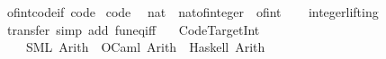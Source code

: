 \begin{isabellebody}
\isamarkupfalse%
%
\endisatagproof
{\isafoldproof}%
%
\isadelimproof
\isanewline
%
\endisadelimproof
\isanewline
{}\isamarkupfalse%
\ of{\isacharunderscore}int{\isacharunderscore}code{\isacharunderscore}if\ {\isacharbrackleft}code{\isacharbrackright}\isanewline
\isanewline
{}\isamarkupfalse%
\ {\isacharbrackleft}code{\isacharbrackright}{\isacharcolon}\isanewline
\ \ {\isachardoublequoteopen}nat\ {\isacharequal}\ nat{\isacharunderscore}of{\isacharunderscore}integer\ {\isasymcirc}\ of{\isacharunderscore}int{\isachardoublequoteclose}\isanewline
\ \ \isamarkupfalse%
\ integer{\isachardot}lifting%
\isadelimproof
\ %
\endisadelimproof
%
\isatagproof
{}\isamarkupfalse%
\ transfer\ {\isacharparenleft}simp\ add{\isacharcolon}\ fun{\isacharunderscore}eq{\isacharunderscore}iff{\isacharparenright}%
\endisatagproof
{\isafoldproof}%
%
\isadelimproof
%
\endisadelimproof
\isanewline
\isanewline
{}\isamarkupfalse%
\isanewline
\ \ \ Code{\isacharunderscore}Target{\isacharunderscore}Int\ {\isasymrightharpoonup}\isanewline
\ \ \ \ {\isacharparenleft}SML{\isacharparenright}\ Arith\ \ {\isacharparenleft}OCaml{\isacharparenright}\ Arith\ \ {\isacharparenleft}Haskell{\isacharparenright}\ Arith\isanewline
%
\isadelimtheory
\isanewline
%
\endisadelimtheory
%
\isatagtheory
{}\isamarkupfalse%
%
\endisatagtheory
{\isafoldtheory}%
%
\isadelimtheory
%
\endisadelimtheory
%
\end{isabellebody}%
